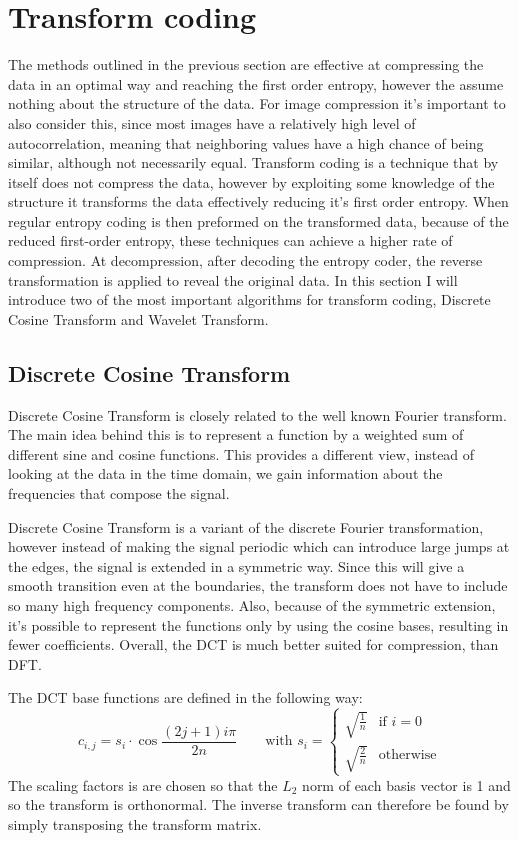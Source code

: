 \documentclass{diploma_style}
\begin{document}
\section{Transform coding}
The methods outlined in the previous section are effective at compressing the data in an optimal way and reaching the first order entropy, however the assume nothing about the structure of the data. For image compression it's important to also consider this, since most images have a relatively high level of autocorrelation, meaning that neighboring values have a high chance of being similar, although not necessarily equal. Transform coding is a technique that by itself does not compress the data, however by exploiting some knowledge of the structure it transforms the data effectively reducing it's first order entropy. When regular entropy coding is then preformed on the transformed data, because of the reduced first-order entropy, these techniques can achieve a higher rate of compression. At decompression, after decoding the entropy coder, the reverse transformation is applied to reveal the original data. In this section I will introduce two of the most important algorithms for transform coding, Discrete Cosine Transform and Wavelet Transform.
\subsection{Discrete Cosine Transform}
Discrete Cosine Transform \cite{ahmed_discrete_1974} is closely related to the well known Fourier transform. The main idea behind this is to represent a function by a weighted sum of different sine and cosine functions. This provides a different view, instead of looking at the data in the time domain, we gain information about the frequencies that compose the signal. 

Discrete Cosine Transform is a variant of the discrete Fourier transformation, however instead of making the signal periodic which can introduce large jumps at the edges, the signal is extended in a symmetric way. Since this will give a smooth transition even at the boundaries, the transform does not have to include so many high frequency components. Also, because of the symmetric extension, it's possible to represent the functions only by using the cosine bases, resulting in fewer coefficients. Overall, the DCT is much better suited for compression, than DFT.

The DCT base functions are defined in the following way:
\begin{equation}
c_{i,j} = s_i \cdot \cos \frac{(2j+1)i\pi}{2n} \qquad \text{with } s_i = 
	\begin{cases}
		\sqrt{\frac{1}{n}} & \text{if } i=0 \\
		\sqrt{\frac{2}{n}} & \text{otherwise}
	\end{cases}
\end{equation}
The scaling factors is are chosen so that the $L_2$ norm of each basis vector is 1 and
so the transform is orthonormal. The inverse transform can therefore be found by
simply transposing the transform matrix.
\end{document}
